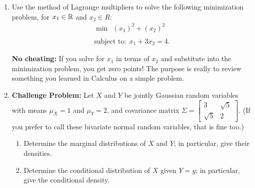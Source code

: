 \documentclass[letterpaper]{article}
\begin{document}
\begin{enumerate}
\begin{enumerate}
\setlength{\itemsep}{.1in}
\renewcommand{\labelenumi}{(\alph{enumi})}
\item Determine the constant $K$ so that $f_{XY}(x,y)$ is a density. Fix $K$ at this value for the rest of the problem.

\item  Determine the marginal distributions of $X$ and $Y$; in particular, give their densities.

\item  Determine the conditional distribution of $X$ given $Y=y$; in particular, give the conditional density.

\end{enumerate}



\item Use the method of Lagrange multipliers to solve the following minimization problem, for $x_1\in \mathbb R$ and $x_2 \in R$:
\begin{align*}
\min~~ (x_1)^2  + (x_2)^2\\
\\
\text{subject to:}~~ x_1 + 3 x_2 =4.
\end{align*}

\noindent \textbf{No cheating:} If you solve for $x_1$ in terms of $x_2$ and substitute into the minimization problem, you get zero points! The purpose is really to review something you learned in Calculus on a simple problem.

\item  \textbf{Challenge Problem:} Let $X$ and $Y$ be jointly Gaussian random variables with means $\mu_X=1$ and $\mu_Y=2$, and covariance matrix $\Sigma = \left[ \begin{array}{cc} 3 & \sqrt{5} \\ \sqrt{5} & 2 \end{array} \right]$. (If you prefer to call these bivariate normal random variables, that is fine too.)

\begin{enumerate}
\setlength{\itemsep}{.1in}
\renewcommand{\labelenumi}{(\alph{enumi})}
\item  Determine the marginal distributions of $X$ and $Y$; in particular, give their densities.

\item  Determine the conditional distribution of $X$ given $Y=y$; in particular, give the conditional density.


\end{enumerate}
\end{enumerate}
\end{document}
